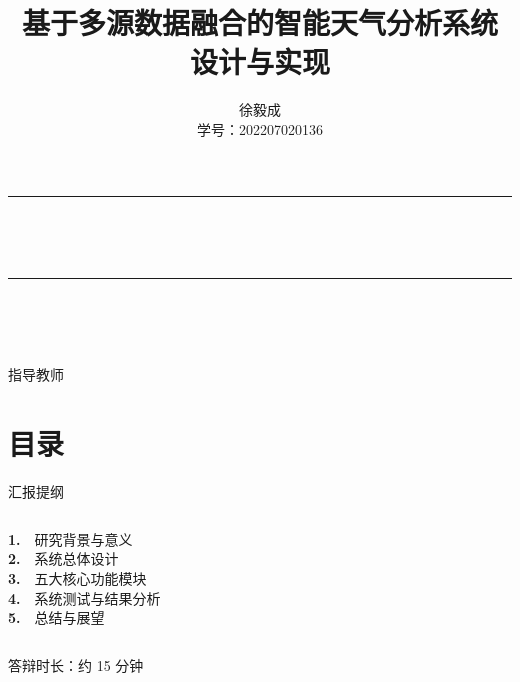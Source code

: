 \documentclass[aspectratio=169,14pt]{beamer}
\title[智能气象信息服务系统]{基于多源数据融合的智能天气分析系统\\设计与实现}
\author[徐毅成]{徐毅成\\\small 学号：202207020136}
\institute[山西财经大学]{山西财经大学}
\date{}
\begin{document}
{
\begin{frame}[plain]
  \centering
  \vspace{8mm}
  {\color{primary}\rule{60mm}{2pt}\\[2mm]}
  {\inserttitle\\[6mm]}
  {\color{primary}\rule{60mm}{2pt}\\[8mm]}
  {\large\insertauthor\\[3mm]}
  {\normalsize\insertinstitute\\[6mm]}
  {\small 指导教师\\[2mm]}
\end{frame}
}

\section{目录}
\begin{frame}{汇报提纲}
  \begin{columns}[T]
      \textbf{\textcolor{primary}{1.}}\ \ 研究背景与意义\\[2mm]
      \textbf{\textcolor{primary}{2.}}\ \ 系统总体设计\\[2mm]
      \textbf{\textcolor{primary}{3.}}\ \ 五大核心功能模块\\[2mm]
      \textbf{\textcolor{primary}{4.}}\ \ 系统测试与结果分析\\[2mm]
      \textbf{\textcolor{primary}{5.}}\ \ 总结与展望\\[2mm]
  \end{columns}
  \vspace{8mm}
  \begin{center}
    {\small 答辩时长：约 15 分钟}
  \end{center}
\end{frame}

\end{document}
